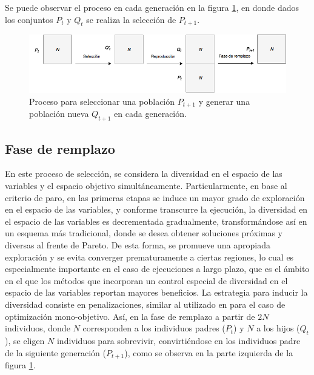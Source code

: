Se puede observar el proceso en cada generación en la figura \ref{fig:Proceso_Generacion}, en donde dados los conjuntos $P_t$ y $Q_t$ se realiza la selección de $P_{t+1}$.
%
\begin{figure}[H]
\centering
\scriptsize
\includegraphics[scale=0.5]
{Figures_Chapter3/Evolution_Process.png}
\decoRule
\caption{Proceso para seleccionar una población $P_{t+1}$ y generar una población nueva $Q_{t+1}$  en cada generación.}
\label{fig:Proceso_Generacion}
\end{figure}
%


\subsection*{Fase de remplazo}

En este proceso de selección, se considera la diversidad en el espacio de las variables y el espacio objetivo simultáneamente.
%
Particularmente, en base al criterio de paro, en las primeras etapas se induce un mayor grado de exploración en el espacio de las variables, y conforme transcurre la ejecución, la diversidad en el espacio de las variables es decrementada gradualmente, transformándose así en un esquema más tradicional, donde se desea obtener soluciones próximas y diversas al frente de Pareto.
%
De esta forma, se promueve una apropiada exploración y se evita converger prematuramente a ciertas regiones, lo cual es especialmente importante en el caso de ejecuciones a largo plazo, que es el ámbito en el que los métodos que incorporan un control especial de diversidad en el espacio de las variables reportan mayores beneficios.
%
La estrategia para inducir la diversidad consiste en penalizaciones, similar al utilizado en \cite{Joel:ANovelDiversityBasedEAForTheTSP} para el caso de optimización mono-objetivo.
%
Así, en la fase de remplazo a partir de $2N$ individuos, donde $N$ corresponden a los individuos padres ($P_t$) y $N$ a los hijos ($Q_t$), se eligen $N$ individuos para sobrevivir, convirtiéndose en los individuos padre de la siguiente generación ($P_{t+1}$), como se observa en la parte izquierda de la figura \ref{fig:Proceso_Generacion}.
%

